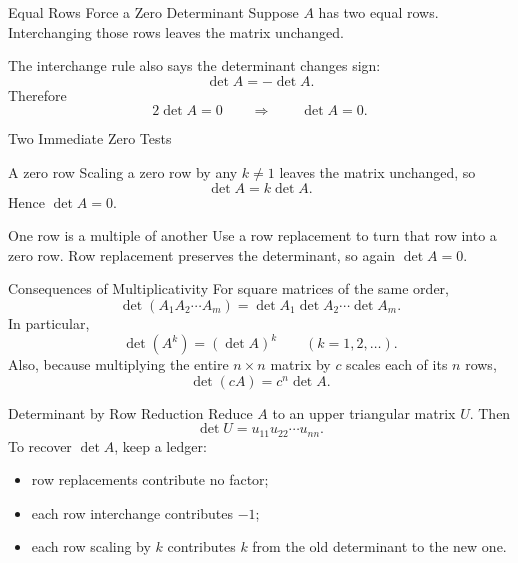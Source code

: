 \begin{frame}{Equal Rows Force a Zero Determinant}
Suppose $A$ has two equal rows. Interchanging those rows leaves the matrix unchanged.
\pause

The interchange rule also says the determinant changes sign:
\[
\det A=-\det A.
\]
Therefore
\[
2\det A=0
\qquad\Longrightarrow\qquad
\boxed{\det A=0}.
\]
\end{frame}

\begin{frame}{Two Immediate Zero Tests}
\begin{block}{A zero row}
Scaling a zero row by any $k\ne1$ leaves the matrix unchanged, so
\[
\det A=k\det A.
\]
Hence $\det A=0$.
\end{block}
\pause
\begin{block}{One row is a multiple of another}
Use a row replacement to turn that row into a zero row. Row replacement preserves the determinant, so again $\det A=0$.
\end{block}
\end{frame}

\begin{frame}{Consequences of Multiplicativity}
For square matrices of the same order,
\[
\det(A_1A_2\cdots A_m)
=\det A_1\det A_2\cdots\det A_m.
\]
In particular,
\[
\det(A^k)=(\det A)^k
\qquad(k=1,2,\ldots).
\]
\pause
Also, because multiplying the entire $n\times n$ matrix by $c$ scales each of its $n$ rows,
\[
\boxed{\det(cA)=c^n\det A}.
\]
\end{frame}

\begin{frame}{Determinant by Row Reduction}
Reduce $A$ to an upper triangular matrix $U$.
\pause
Then
\[
\det U=u_{11}u_{22}\cdots u_{nn}.
\]
To recover $\det A$, keep a ledger:
\begin{itemize}
  \item row replacements contribute no factor;
  \item each row interchange contributes $-1$;
  \item each row scaling by $k$ contributes $k$ from the old determinant to the new one.
\end{itemize}
\end{frame}

